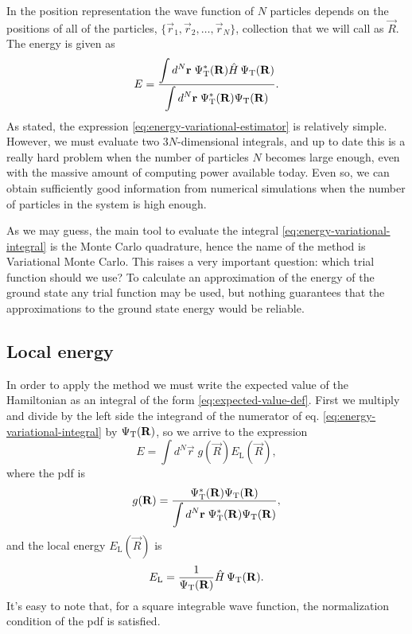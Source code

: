 In the position representation the wave function of $N$ particles depends on the
positions of all of the particles, $\{ \vec r_1, \vec r_2, \ldots, \vec r_N \}$,
collection that we will call as $\vec R$. The energy is given as
%
\begin{equation}
  \label{eq:energy-variational-integral}
  E = \frac{\displaystyle \int d^N \mathbf r \; \Psi_{\mathrm{T}}^{*}(\mathbf R) \hat H \, \Psi_{\mathrm{T}}(\mathbf R)}{
    \displaystyle \int d^N \mathbf r \; \Psi_{\mathrm{T}}^{*}(\mathbf R) \Psi_{\mathrm{T}}(\mathbf R)}.
\end{equation}
%
As stated, the expression \eqref{eq:energy-variational-estimator} is relatively
simple. However, we must evaluate two $3N$-dimensional integrals, and up to date
this is a really hard problem when the number of particles $N$ becomes large
enough, even with the massive amount of computing power available today. Even
so, we can obtain sufficiently good information from numerical simulations when
the number of particles in the system is high enough.

As we may guess, the main tool to evaluate the integral
\eqref{eq:energy-variational-integral} is the Monte Carlo quadrature, hence the
name of the method is Variational Monte Carlo. This raises a very important
question: which trial function should we use? To calculate an approximation of
the energy of the ground state any trial function may be used, but nothing
guarantees that the approximations to the ground state energy would be reliable.


\subsection{Local energy}

In order to apply the {\VMC} method we must write the expected value of the
Hamiltonian as an integral of the form \eqref{eq:expected-value-def}. First we
multiply and divide by the left side the integrand of the numerator of eq.
\eqref{eq:energy-variational-integral} by $\Psi_{\mathrm{T}}(\mathbf R)$, so  we arrive to the
expression
%
\begin{equation}
  E = \int d^N \vec r \; g(\vec R) E_{\mathrm{L}}(\vec R),
\end{equation}
%
where the pdf is
%
\begin{equation}
  g(\mathbf R) = \frac{\Psi_{\mathrm{T}}^{*}(\mathbf R) \Psi_{\mathrm{T}}(\mathbf R)}{\displaystyle \int d^N \mathbf r \; \Psi_{\mathrm{T}}^{*}(\mathbf R) \Psi_{\mathrm{T}}(\mathbf R)},
\end{equation}
%
and the local energy $E_\mathrm{L}(\vec R)$ is
%
\begin{equation}
  \label{eq:local-energy-definition}
  E_{\mathrm{L}} = \frac{1}{\Psi_{\mathrm{T}}(\mathbf R)} \hat H \, \Psi_{\mathrm{T}}(\mathbf R).
\end{equation}
%
It's easy to note that, for a square integrable wave function, the normalization
condition of the pdf is satisfied.

